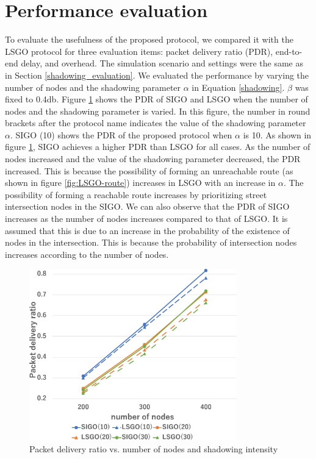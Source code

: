 \documentclass[conference]{IEEEtran}
\begin{document}
\section{Performance evaluation}
\label{evaluation}
To evaluate the usefulness of the proposed protocol, we compared it with the LSGO protocol for three evaluation items: packet delivery ratio (PDR), end-to-end delay, and overhead.
The simulation scenario and settings were the same as in Section \ref{shadowing_evaluation}. 
We evaluated the performance by varying the number of nodes and the shadowing parameter $\alpha$ in Equation \ref{shadowing}. 
$\beta$ was fixed to 0.4db.
Figure \ref{fig:PDR} shows the PDR of SIGO and LSGO when the number of nodes and the shadowing parameter is varied. 
In this figure, the number in round brackets after the protocol name indicates the value of the shadowing parameter $\alpha$. SIGO (10) shows the PDR of the proposed protocol when $\alpha$ is 10.
As shown in figure \ref{fig:PDR}, SIGO achieves a higher PDR than LSGO for all cases. 
As the number of nodes increased and the value of the shadowing parameter decreased, the PDR increased. This is because the possibility of forming an unreachable route (as shown in figure \ref{fig:LSGO-route}) increases in LSGO with an increase in $\alpha$. The possibility of forming a reachable route increases by prioritizing street intersection nodes in the SIGO.
We can also observe that the PDR of SIGO increases as the number of nodes increases compared to that of LSGO. It is assumed that this is due to an increase in the probability of the existence of nodes in the intersection. 
This  is because the probability of intersection nodes increases according to the number of nodes.

\begin{figure}[!ht]
\centering
\includegraphics[width=90mm]{figures/PDR.eps}
\caption{Packet delivery ratio vs. number of nodes and shadowing intensity}
\label{fig:PDR}
\end{figure}
\end{document}
